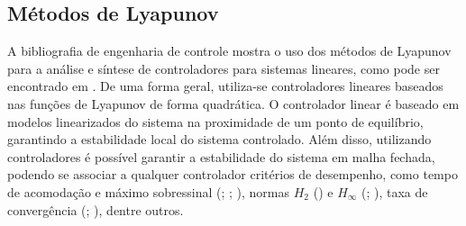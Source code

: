 \subsection{Métodos de Lyapunov}
A bibliografia de engenharia de controle mostra o uso dos métodos de Lyapunov para a análise e síntese de controladores para sistemas lineares, como pode ser encontrado em \cite{ChenLSTI}. De uma forma geral, utiliza-se controladores lineares baseados nas funções de Lyapunov de forma quadrática. O controlador linear é baseado em modelos linearizados do sistema na proximidade de um ponto de equilíbrio, garantindo a estabilidade local do sistema controlado. Além disso, utilizando controladores é possível garantir a estabilidade do sistema em malha fechada, podendo se associar a qualquer controlador critérios de desempenho, como tempo de acomodação e máximo sobressinal (\cite{Hang1987RefinementsOT}; \cite{601347}; \cite{1049598}), normas $H_2$ (\cite{4789992}) e $H_\infty$ (\cite{Petersen}; \cite{Wang1992RobustCO}), taxa de convergência (\cite{Elia2001StabilizationInformation}; \cite{LORIA200213}), dentre outros.

